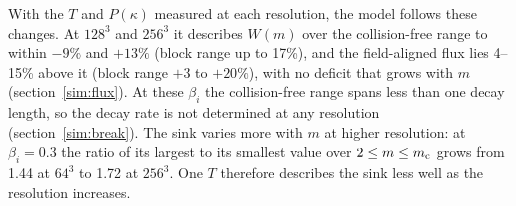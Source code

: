 With the $T$ and $P(\kappa)$ measured at each resolution, the model follows these changes. At $128^3$ and $256^3$ it describes $W(m)$ over the collision-free range to within $-9\%$ and $+13\%$ (block range up to 17\%), and the field-aligned flux lies 4--15\% above it (block range $+3$ to $+20\%$), with no deficit that grows with $m$ (section~\ref{sim:flux}). At these $\beta_i$ the collision-free range spans less than one decay length, so the decay rate is not determined at any resolution (section~\ref{sim:break}). The sink varies more with $m$ at higher resolution: at $\beta_i=0.3$ the ratio of its largest to its smallest value over $2\le m\le m_{\rm c}$ grows from 1.44 at $64^3$ to 1.72 at $256^3$. One $T$ therefore describes the sink less well as the resolution increases.

\FloatBarrier
